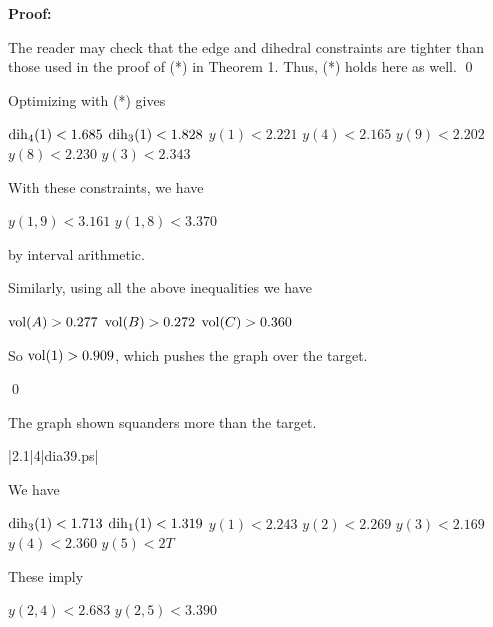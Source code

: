 {\bf Proof:}

The reader may check that the edge and dihedral constraints are tighter than those used in the proof of (*) in Theorem 1.  Thus, (*) holds here as well. \qed

Optimizing with (*) gives

$\operatorname{dih}_4(1) < 1.685$ \newline
$\operatorname{dih}_3(1) < 1.828$ \newline
$y(1)<2.221$ \newline
$y(4)<2.165$ \newline
$y(9)<2.202$ \newline
$y(8)<2.230$ \newline
$y(3)<2.343$ \newline


With these constraints, we have

$y(1,9) < 3.161$ \newline
$y(1,8) < 3.370$ \newline

by interval arithmetic.

Similarly, using all the above inequalities we have

$\operatorname{vol}(A) > 0.277$ \newline
$\operatorname{vol}(B) > 0.272$ \newline
$\operatorname{vol}(C)> 0.360$ \newline

So $\operatorname{vol}(1)>0.909$, which pushes the graph over the target.

\qed


\bigskip



 The graph shown 
squanders more than the target.  \endproclaim

\gram|2.1|4|dia39.ps|  %

We have 

$\operatorname{dih}_3(1) < 1.713$ \newline
$\operatorname{dih}_1(1) < 1.319$ \newline
$y(1)<2.243$ \newline
$y(2)<2.269$ \newline
$y(3)<2.169$ \newline
$y(4)<2.360$ \newline
$y(5)<2T$ \newline

These imply 

$y(2,4)<2.683$ \newline
$y(2,5)<3.390$ \newline

